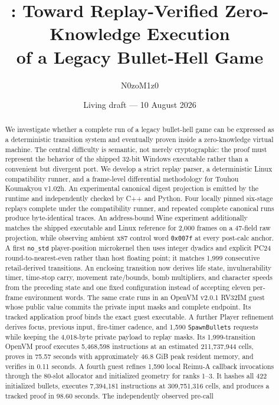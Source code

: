 \documentclass[10pt]{article}
\title{\project: Toward Replay-Verified Zero-Knowledge Execution\\
of a Legacy Bullet-Hell Game}
\author{N0zoM1z0}
\date{Living draft --- 10 August 2026}
\newcommand{\thgame}{Touhou Koumakyou v1.02h}
\newcommand{\code}[1]{\texttt{#1}}
\begin{document}
\maketitle

\begin{abstract}
We investigate whether a complete run of a legacy bullet-hell game can be
expressed as a deterministic transition system and eventually proven inside a
zero-knowledge virtual machine.  The central difficulty is semantic, not merely
cryptographic: the proof must represent the behavior of the shipped 32-bit
Windows executable rather than a convenient but divergent port.  We develop a
strict replay parser, a deterministic Linux compatibility runner, and a
frame-level differential methodology for \thgame.  An experimental canonical
digest projection is emitted by the runtime and independently checked by C++
and Python.  Four locally pinned six-stage replays complete under the
compatibility runner, and repeated complete canonical runs produce
byte-identical traces.  An address-bound Wine experiment additionally matches
the shipped executable and Linux reference for 2,000 frames on a 47-field raw
projection, while observing ambient x87 control word \code{0x007f} at every
post-calc anchor.  A first \code{no\_std} player-position microkernel then uses
integer dyadics and explicit PC24 round-to-nearest-even rather than host
floating point; it matches 1,999 consecutive retail-derived transitions.  An
enclosing transition now derives life state, invulnerability timer, time-stop
carry, movement rate/bounds, bomb multipliers, and character speeds from the
preceding state and one fixed configuration instead of accepting eleven
per-frame environment words.  The same crate runs in an OpenVM v2.0.1 RV32IM
guest whose public value commits the private input masks and complete endpoint.
Its tracked application proof binds the exact guest executable.  A further
Player refinement derives focus, previous input, fire-timer cadence, and 1,590
\code{SpawnBullets} requests while keeping the 4,018-byte private payload to
replay masks.  Its 1,999-transition OpenVM proof executes 5,468,598
instructions at an estimated 211,737,944 cells, proves in 75.57 seconds with
approximately 46.8 GiB peak resident memory, and verifies in 0.11 seconds.  A
fourth guest refines 1,590 local Reimu-A callback invocations through the
80-slot allocator and initialized geometry for ranks 1--3.  It hashes all 422
initialized bullets, executes 7,394,181 instructions at 309,751,316 cells, and
produces a tracked proof in 98.60 seconds.  The independently observed pre-call

\end{abstract}
\end{document}
